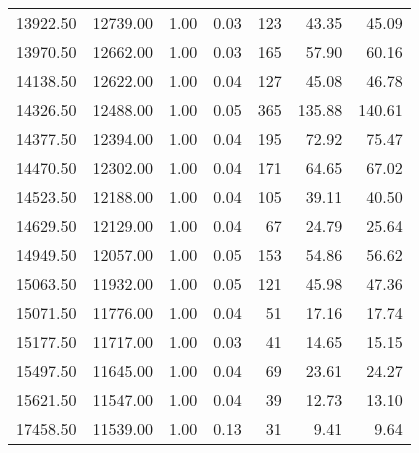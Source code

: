 \begin{table}
\begin{tabular}{rrrrrrr}
13922.50 & 12739.00 & 1.00 & 0.03 & 123 & 43.35 & 45.09 \\
13970.50 & 12662.00 & 1.00 & 0.03 & 165 & 57.90 & 60.16 \\
14138.50 & 12622.00 & 1.00 & 0.04 & 127 & 45.08 & 46.78 \\
14326.50 & 12488.00 & 1.00 & 0.05 & 365 & 135.88 & 140.61 \\
14377.50 & 12394.00 & 1.00 & 0.04 & 195 & 72.92 & 75.47 \\
14470.50 & 12302.00 & 1.00 & 0.04 & 171 & 64.65 & 67.02 \\
14523.50 & 12188.00 & 1.00 & 0.04 & 105 & 39.11 & 40.50 \\
14629.50 & 12129.00 & 1.00 & 0.04 & 67 & 24.79 & 25.64 \\
14949.50 & 12057.00 & 1.00 & 0.05 & 153 & 54.86 & 56.62 \\
15063.50 & 11932.00 & 1.00 & 0.05 & 121 & 45.98 & 47.36 \\
15071.50 & 11776.00 & 1.00 & 0.04 & 51 & 17.16 & 17.74 \\
15177.50 & 11717.00 & 1.00 & 0.03 & 41 & 14.65 & 15.15 \\
15497.50 & 11645.00 & 1.00 & 0.04 & 69 & 23.61 & 24.27 \\
15621.50 & 11547.00 & 1.00 & 0.04 & 39 & 12.73 & 13.10 \\
17458.50 & 11539.00 & 1.00 & 0.13 & 31 & 9.41 & 9.64 \\
\bottomrule
\end{tabular}
\end{table}
